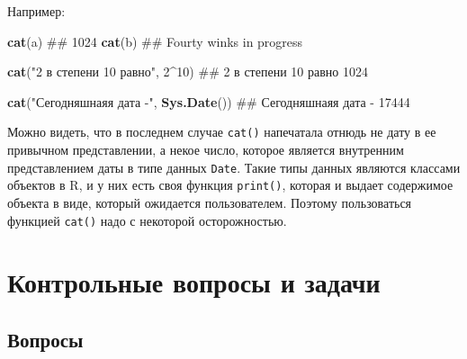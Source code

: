 \documentclass[]{book}
\newenvironment{Shaded}{\begin{snugshade}}{\end{snugshade}}
\newcommand{\KeywordTok}[1]{\textcolor[rgb]{0.13,0.29,0.53}{\textbf{#1}}}
\newcommand{\DecValTok}[1]{\textcolor[rgb]{0.00,0.00,0.81}{#1}}
\newcommand{\StringTok}[1]{\textcolor[rgb]{0.31,0.60,0.02}{#1}}
\newcommand{\OperatorTok}[1]{\textcolor[rgb]{0.81,0.36,0.00}{\textbf{#1}}}
\newcommand{\NormalTok}[1]{#1}
\begin{document}
Например:

\begin{Shaded}
\begin{Highlighting}[]
\KeywordTok{cat}\NormalTok{(a)}
\NormalTok{## 1024}
\KeywordTok{cat}\NormalTok{(b)}
\NormalTok{## Fourty winks in progress}

\KeywordTok{cat}\NormalTok{(}\StringTok{"2 в степени 10 равно"}\NormalTok{, }\DecValTok{2}\OperatorTok{^}\DecValTok{10}\NormalTok{)}
\NormalTok{## 2 в степени 10 равно 1024}

\KeywordTok{cat}\NormalTok{(}\StringTok{"Сегодняшнаяя дата -"}\NormalTok{, }\KeywordTok{Sys.Date}\NormalTok{())}
\NormalTok{## Сегодняшнаяя дата - 17444}
\end{Highlighting}
\end{Shaded}

Можно видеть, что в последнем случае \texttt{cat()} напечатала отнюдь не
дату в ее привычном представлении, а некое число, которое является
внутренним представлением даты в типе данных \texttt{Date}. Такие типы
данных являются классами объектов в R, и у них есть своя функция
\texttt{print()}, которая и выдает содержимое объекта в виде, который
ожидается пользователем. Поэтому пользоваться функцией \texttt{cat()}
надо с некоторой осторожностью.

\section{Контрольные вопросы и задачи}\label{questions_tasks_basics}

\subsection{Вопросы}\label{questions_basics}
\end{document}

